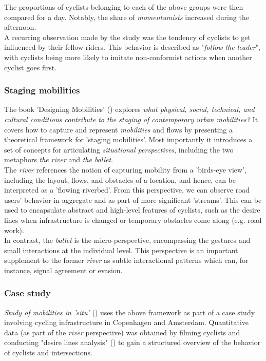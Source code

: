 The proportions of cyclists belonging to each of the above groups were then compared for a day. 
Notably, the share of \textit{momentumists} increased during the afternoon.
 \ \\

A recurring observation made by the study was the tendency of cyclists to get influenced by their fellow riders. 
This behavior is described as "\textit{follow the leader}", with cyclists being more likely to imitate non-conformist 
actions when another cyclist goes first. 

\subsubsection{Staging mobilities}
The book 'Designing Mobilities' (\cite{designinig_mobilities}) explores \textit{what physical, social, technical, 
and cultural conditions contribute to the staging of contemporary urban mobilities?} 
It covers how to capture and represent \textit{mobilities} and flows by presenting a theoretical framework for 'staging mobilities'. 
Most importantly it introduces a set of concepts for articulating \textit{situational perspectives}, 
including the two metaphors \textit{the river} and \textit{the ballet}. 
 \ \\

 The \textit{river} references the notion of capturing mobility from a 'birds-eye view', including the layout, 
 flows, and obstacles of a location, and hence, can be interpreted as a 'flowing riverbed'. 
 From this perspective, we can observe road users' behavior in aggregate and as part of more significant 'streams'. 
 This can be used to encapsulate abstract and high-level features of cyclists, such as the desire lines
 when infrastructure is changed or temporary obstacles come along (e.g. road work).
 \ \\

In contrast, the \textit{ballet} is the micro-perspective, encompassing the gestures and small interactions at the individual level.
This perspective is an important supplement to the former \textit{river} as subtle interactional patterns which can, for instance,
 signal agreement or evasion.

\subsubsection{Case study}
\textit{Study of mobilities in 'situ'} (\cite{situ}) uses the above framework as part of a case study involving cycling infrastructure in 
Copenhagen and Amsterdam. Quantitative data (as part of the \textit{river} perspective) was obtained by filming cyclists and conducting 
"desire lines analysis" (\cite{cva}) to gain a structured overview of the behavior of cyclists and intersections. 


